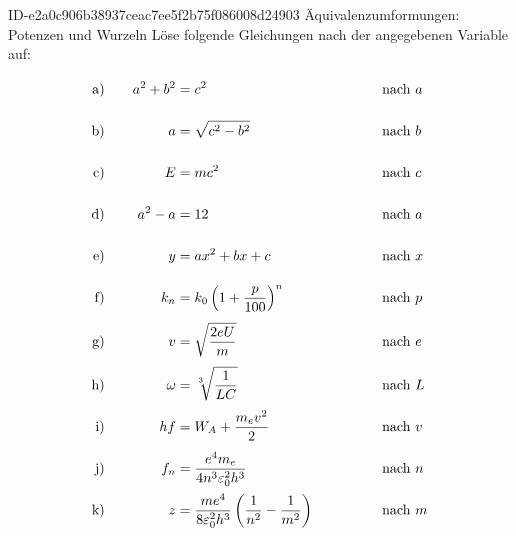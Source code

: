 \begin{exercise}
      {ID-e2a0c906b38937ceac7ee5f2b75f086008d24903}
      {Äquivalenzumformungen: Potenzen und Wurzeln}
  \ifproblem\problem
    \newcommand{\exnum}[1]{\text{\rule[-2.5ex]{0pt}{6ex}#1}}
    Löse folgende Gleichungen nach der angegebenen Variable auf:
    \allowdisplaybreaks
    \begin{alignat*}{4}
      \exnum{a)}&\quad &  a^{2}+b^{2}&=c^{2}                                                                                & \quad&\quad & \quad&\text{nach $a$}    \\
      \exnum{b)}&\quad &            a&=\sqrt{c^{2}-b^{2}}                                                                   & \quad&\quad & \quad&\text{nach $b$}    \\
      \exnum{c)}&\quad &            E&=mc^{2}                                                                               & \quad&\quad & \quad&\text{nach $c$}    \\
      \exnum{d)}&\quad &      a^{2}-a&=12                                                                                   & \quad&\quad & \quad&\text{nach $a$}    \\
      \exnum{e)}&\quad &            y&=ax^{2}+bx+c                                                                          & \quad&\quad & \quad&\text{nach $x$}    \\
      \exnum{f)}&\quad &        k_{n}&=k_{0}\left(1+\frac{p}{100}\right)^{n}                                                & \quad&\quad & \quad&\text{nach $p$}    \\
      \exnum{g)}&\quad &            v&=\sqrt{\frac{2eU}{m}}                                                                 & \quad&\quad & \quad&\text{nach $e$}    \\
      \exnum{h)}&\quad &       \omega&=\sqrt[3\;\,]{\frac{1}{LC}}                                                           & \quad&\quad & \quad&\text{nach $L$}    \\
      \exnum{i)}&\quad &           hf&=W_{A}+\frac{m_{e}v^{2}}{2}                                                           & \quad&\quad & \quad&\text{nach $v$}    \\
      \exnum{j)}&\quad &        f_{n}&=\frac{e^{4}m_{e}}{4n^{3}\varepsilon_{0}^{2}h^{3}}                                    & \quad&\quad & \quad&\text{nach $n$}    \\
      \exnum{k)}&\quad &            z&=\frac{me^{4}}{8\varepsilon_{0}^{2}h^{3}}\left(\frac{1}{n^{2}}-\frac{1}{m^{2}}\right) & \quad&\quad & \quad&\text{nach $m$}    \\

\end{alignat*}
\end{exercise}
